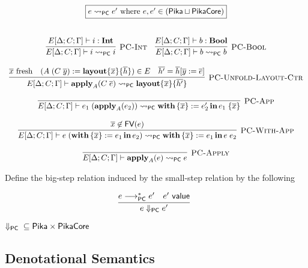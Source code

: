 \[
  \begin{array}{c}
    \fbox{$e \pcNotionStep e'\textrm{ where $e, e' \in (\Pika \sqcup \PikaCore)$}$}
    \fboxNewlines
    \labinfer[PC-Int]{E[\Delta;C;\Gamma] \vdash i \pcNotionStep i}{E[\Delta;C;\Gamma] \vdash i : \Int}
    ~~~
    \labinfer[PC-Bool]{E[\Delta;C;\Gamma] \vdash b \pcNotionStep b}{E[\Delta;C;\Gamma] \vdash b : \Bool}
    \\\\
    \labinfer[PC-Unfold-Layout-Ctr]{E[\Delta;C;\Gamma] \vdash \apply_A(C\; \overline{e}) \pcNotionStep \sslmath{\overline{x}}{\overline{h'}}}
      {\fresh{\overline{x}}
      & (A\; (C\; \overline{y}) := \sslmath{\overline{x}}{\overline{h}}) \in E
      & \overline{h'} = \overline{h}[\overline{y} := \overline{e}]
      }
    \\\\
    \labinfer[PC-App]{E[\Delta;C;\Gamma] \vdash e_1\;(\apply_A(e_2)) \pcNotionStep \withIn{\{ \overline{x} \} := e_2'} e_1\; \{\overline{x}\}}
      {}
    \\\\
    \labinfer[PC-With-App]{E[\Delta;C;\Gamma] \vdash e\; (\withIn{\{ \overline{x} \} := e_1} e_2) \pcNotionStep \withIn{\{ \overline{x} \} := e_1} e\; e_2}
      {\overline{x} \not\in \FV(e)}
    \\\\
    \labinfer[PC-Apply]{E[\Delta;C;\Gamma] \vdash \apply_A(e) \pcNotionStep e}
      {}
  \end{array}
\]

Define the big-step relation induced by the small-step relation by the following

\[
  \begin{array}{c}
    \labinfer{e \pcStep e'}
      {e \pcsteps e' & e' ~\val}
  \end{array}
\]

\begin{theorem} $\Downarrow_{\textsf{PC}}{} \subseteq \textsf{Pika} \times \textsf{PikaCore}$
\end{theorem}

\subsection{Denotational Semantics}

